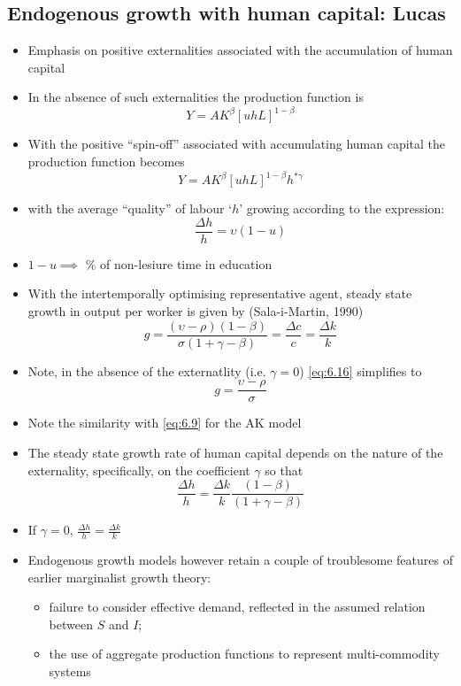 \documentclass{article}
\begin{document}
\subsection{Endogenous growth with human capital: Lucas}
\begin{itemize}
	\item Emphasis on positive externalities associated with the accumulation of human capital
	\item In the absence of such externalities the production function is
	\begin{equation}
		Y = AK^\beta [uhL]^{1-\beta} \label{eq:6.13}
	\end{equation}
	\item With the positive ``spin-off'' associated with accumulating human capital the production function becomes
	\begin{equation}
		Y = AK^\beta [uhL]^{1-\beta} h^{\ast\gamma} \label{eq:6.14}
	\end{equation}
	\item with the average ``quality'' of labour `\( h \)' growing according to the expression:
	\begin{equation}
		\frac{\Delta h}{h} = \upsilon(1-u) \label{eq:6.15}
	\end{equation}
	\item \( 1 - u \implies \) \% of non-lesiure time in education
	\item With the intertemporally optimising representative agent, steady state growth in output per worker is given by (Sala-i-Martin, 1990) 
	\begin{equation}
		g = \frac{(\upsilon - \rho)(1-\beta)}{\sigma(1+\gamma-\beta)} = \frac{\Delta c}{c} = \frac{\Delta k}{k} \label{eq:6.16}
	\end{equation}
	\item Note, in the absence of the externatlity (i.e. \( \gamma = 0 \)) \cref{eq:6.16} simplifies to
	\begin{equation}
		g = \frac{\upsilon - \rho}{\sigma} \label{eq:6.17}
	\end{equation}
	\item Note the similarity with \cref{eq:6.9} for the AK model
	\item The steady state growth rate of human capital depends on the nature of the externality, specifically, on the coefficient \( \gamma \) so that
	\begin{equation}
		\frac{\Delta h}{h} = \frac{\Delta k}{k} \frac{(1-\beta)}{(1 + \gamma - \beta)} \label{eq:6.18}
	\end{equation}
	\item If \( \gamma = 0 \), \( \frac{\Delta h}{h} = \frac{\Delta k}{k} \)  
	\item Endogenous growth models however retain a couple of troublesome features of earlier marginalist growth theory:
	\begin{itemize}
		\item failure to consider effective demand, reflected in the assumed relation between \( S \) and \( I \);
		\item the use of aggregate production functions to represent multi-commodity systems
	\end{itemize}
\end{itemize}
\end{document}
